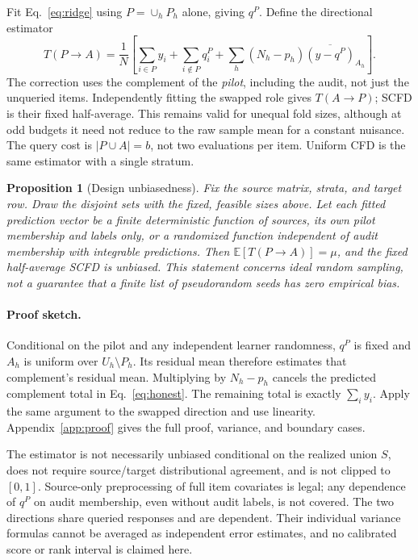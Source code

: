 \documentclass{article}
\newtheorem{proposition}{Proposition}
\newcommand{\E}{\mathbb E}
\begin{document}
Fit Eq.~\eqref{eq:ridge} using $P=\cup_hP_h$ alone, giving $q^P$. Define the directional estimator
\begin{equation}\label{eq:honest}
T(P\!\to\!A)=\frac1N\left[\sum_{i\in P}y_i+\sum_{i\notin P}q_i^P
+\sum_h(N_h-p_h)\overline{(y-q^P)}_{A_h}\right].
\end{equation}
The correction uses the complement of the \emph{pilot}, including the audit, not just the unqueried items. Independently fitting the swapped role gives $T(A\!\to\!P)$; SCFD is their fixed half-average. This remains valid for unequal fold sizes, although at odd budgets it need not reduce to the raw sample mean for a constant nuisance. The query cost is $|P\cup A|=b$, not two evaluations per item. Uniform CFD is the same estimator with a single stratum.

\begin{proposition}[Design unbiasedness]\label{prop:unbiased}
Fix the source matrix, strata, and target row. Draw the disjoint sets with the fixed, feasible sizes above. Let each fitted prediction vector be a finite deterministic function of sources, its own pilot membership and labels only, or a randomized function independent of audit membership with integrable predictions. Then $\E[T(P\to A)]=\mu$, and the fixed half-average SCFD is unbiased. This statement concerns ideal random sampling, not a guarantee that a finite list of pseudorandom seeds has zero empirical bias.
\end{proposition}
\paragraph{Proof sketch.}
Conditional on the pilot and any independent learner randomness, $q^P$ is fixed and $A_h$ is uniform over $U_h\setminus P_h$. Its residual mean therefore estimates that complement's residual mean. Multiplying by $N_h-p_h$ cancels the predicted complement total in Eq.~\eqref{eq:honest}. The remaining total is exactly $\sum_i y_i$. Apply the same argument to the swapped direction and use linearity. Appendix~\ref{app:proof} gives the full proof, variance, and boundary cases.

The estimator is not necessarily unbiased conditional on the realized union $S$, does not require source/target distributional agreement, and is not clipped to $[0,1]$. Source-only preprocessing of full item covariates is legal; any dependence of $q^P$ on audit membership, even without audit labels, is not covered. The two directions share queried responses and are dependent. Their individual variance formulas cannot be averaged as independent error estimates, and no calibrated score or rank interval is claimed here.
\end{document}
